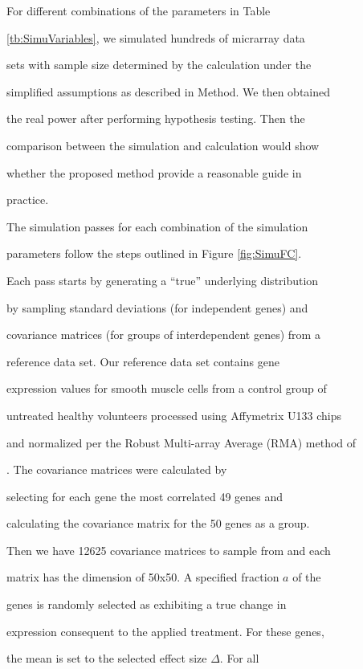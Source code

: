 \documentclass[12pt]{article}
\begin{document}
For different combinations of the parameters in Table

\ref{tb:SimuVariables}, we simulated hundreds of micrarray data

sets with sample size determined by the calculation under the

simplified assumptions as described in Method.  We then obtained

the real power after performing hypothesis testing.  Then the

comparison between the simulation and calculation would show

whether the proposed method provide a reasonable guide in

practice.



The simulation passes for each combination of the simulation

parameters follow the steps outlined in Figure \ref{fig:SimuFC}.



Each pass starts by generating a ``true'' underlying distribution

by sampling standard deviations (for independent genes) and

covariance matrices (for groups of interdependent genes) from a

reference data set.  Our reference data set contains gene

expression values for smooth muscle cells from a control group of

untreated healthy volunteers processed using Affymetrix U133 chips

and normalized per the Robust Multi-array Average (RMA) method of

\citet{Irizarry03}.  The covariance matrices were calculated by

selecting for each gene the most correlated 49 genes and

calculating the covariance matrix for the 50 genes as a group.

Then we have 12625 covariance matrices to sample from and each

matrix has the dimension of 50x50. A specified fraction $a$ of the

genes is randomly selected as exhibiting a true change in

expression consequent to the applied treatment. For these genes,

the mean is set to the selected effect size $\Delta$. For all
\end{document}
